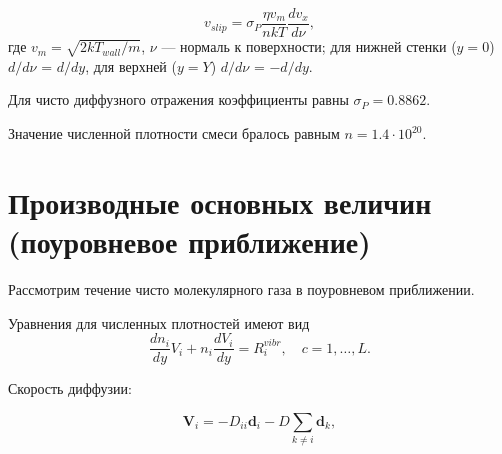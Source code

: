 \documentclass[12pt]{article}
\begin{document}
\begin{equation}
  v_{slip} = \sigma_{P} \frac{\eta v_{m}}{nkT}\frac{d v_{x}}{d \nu},
\end{equation}
где $v_{m} = \sqrt{2kT_{wall} / m}$, $\nu$ --- нормаль к поверхности; для нижней стенки ($y=0$) $d / d \nu$ = $d / d y$, для верхней ($y=Y$) $d / d \nu$ = $-d / d y$.

Для чисто диффузного отражения коэффициенты равны $\sigma_{P} = 0.8862$.

Значение численной плотности смеси бралось равным $n=1.4 \cdot 10^{20}$.



\section{Производные основных величин (поуровневое приближение)}
Рассмотрим течение чисто молекулярного газа в поуровневом приближении.

Уравнения для численных плотностей имеют вид
\begin{equation}
  \frac{d n_{i}}{d y} V_{i} + n_{i}\frac{d V_{i}}{d y} = R_{i}^{vibr},\quad c=1,\ldots,L.\label{densityeqn-sts}
\end{equation}

Скорость диффузии:

\begin{equation}
   \mathbf{V}_{i} = -D_{ii}\mathbf{d}_{i} -D \sum_{k \neq i}\mathbf{d}_{k},
\end{equation}
\end{document}
